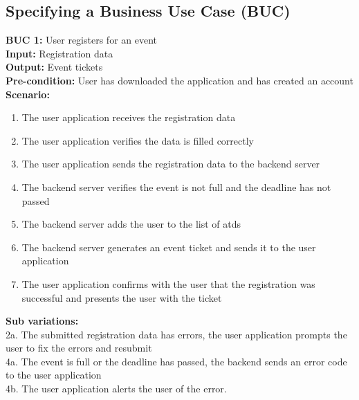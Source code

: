 \documentclass[12pt]{article}
\begin{document}
\subsection{Specifying a Business Use Case (BUC)}

\noindent\textbf{BUC 1: } User registers for an event \\
\textbf{Input:} Registration data \\
\textbf{Output:} Event tickets \\
\textbf{Pre-condition:} User has downloaded the application and has created an account \\
\textbf{Scenario:} \\
\begin{enumerate}
  \item The user application receives the registration data
  \item The user application verifies the data is filled correctly
  \item The user application sends the registration data to the backend server
  \item The backend server verifies the event is not full and the deadline has not passed
  \item The backend server adds the user to the list of \glspl{atd}
  \item The backend server generates an event ticket and sends it to the user application
  \item The user application confirms with the user that the registration was successful and presents the user with the ticket
\end{enumerate}
\textbf{Sub variations:} \\
2a. The submitted registration data has errors, the user application prompts the user to fix the errors and resubmit \\
4a. The event is full or the deadline has passed, the backend sends an error code to the user application \\
4b. The user application alerts the user of the error. \\
\end{document}
